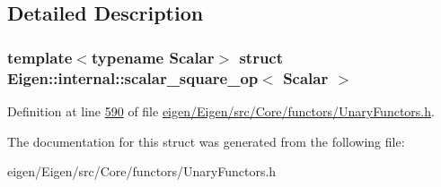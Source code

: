 \subsection{Detailed Description}
\subsubsection*{template$<$typename Scalar$>$\newline
struct Eigen\+::internal\+::scalar\+\_\+square\+\_\+op$<$ Scalar $>$}



Definition at line \hyperlink{eigen_2_eigen_2src_2_core_2functors_2_unary_functors_8h_source_l00590}{590} of file \hyperlink{eigen_2_eigen_2src_2_core_2functors_2_unary_functors_8h_source}{eigen/\+Eigen/src/\+Core/functors/\+Unary\+Functors.\+h}.



The documentation for this struct was generated from the following file\+:\begin{DoxyCompactItemize}
\item 
eigen/\+Eigen/src/\+Core/functors/\+Unary\+Functors.\+h\end{DoxyCompactItemize}

